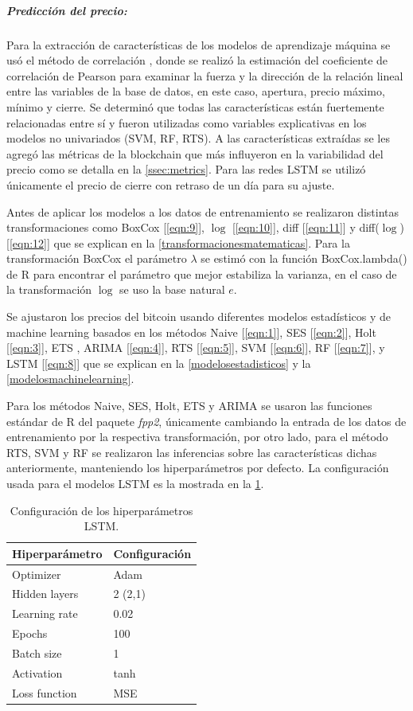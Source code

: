 \subparagraph{Predicción del precio:}
\label{met:prediccion}
Para la extracción de características de los modelos de aprendizaje máquina se usó el método de correlación \parencite{tandonBitcoinPriceForecasting2019}, donde se realizó la estimación del coeficiente de correlación de Pearson para examinar la fuerza y la dirección de la relación lineal entre las variables de la base de datos, en este caso, apertura, precio máximo, mínimo y cierre. Se determinó que todas las características están fuertemente relacionadas entre sí y fueron utilizadas como variables explicativas en los modelos no univariados (SVM, RF, RTS). A las características extraídas se les agregó las métricas de la blockchain que más influyeron en la variabilidad del precio como se detalla en la \cref{ssec:metrics}.    
Para las redes LSTM se utilizó únicamente el precio de cierre con retraso de un día para su ajuste.

Antes de aplicar los modelos a los datos de entrenamiento se realizaron distintas transformaciones como BoxCox [\ref{eqn:9}], $\log$ [\ref{eqn:10}], diff [\ref{eqn:11}] y diff($\log$) [\ref{eqn:12}] que se explican en la \cref{transformacionesmatematicas}. Para la transformación BoxCox el parámetro $\lambda$ se estimó con la función BoxCox.lambda() de R para encontrar el parámetro que mejor estabiliza la varianza, en el caso de la transformación $\log$ se uso la base natural $e$.

Se ajustaron los precios del bitcoin usando diferentes modelos estadísticos y de machine learning basados en los métodos Naive [\ref{eqn:1}], SES [\ref{eqn:2}], Holt [\ref{eqn:3}], ETS \footnotemark , ARIMA [\ref{eqn:4}], RTS [\ref{eqn:5}], SVM [\ref{eqn:6}], RF [\ref{eqn:7}], y LSTM [\ref{eqn:8}] que se explican en la \cref{modelosestadisticos} y la \cref{modelosmachinelearning}.

Para los métodos Naive, SES, Holt, ETS y ARIMA se usaron las funciones estándar de R del paquete \emph{fpp2}, únicamente cambiando la entrada de los datos de entrenamiento por la respectiva transformación, por otro lado, para el método RTS, SVM y RF se realizaron las inferencias sobre las características dichas anteriormente, manteniendo los hiperparámetros por defecto. La configuración usada para el modelos LSTM es la mostrada en la \cref{tab:Table10}.

\begin{table}[!h]
	\centering
	\begin{tabular}{p{4cm} p{4cm}  }
		\toprule
		\textbf{Hiperparámetro} & \textbf{Configuración}\\
		\midrule
		Optimizer & Adam\\
		Hidden layers & 2 (2,1)\\
		Learning rate & 0.02\\
		Epochs & 100\\
		Batch size & 1\\
		Activation & tanh\\
		Loss function & MSE\\
		\bottomrule
		\hline
	\end{tabular}
	\caption{Configuración de los hiperparámetros LSTM.}
	\label{tab:Table10}
\end{table}

